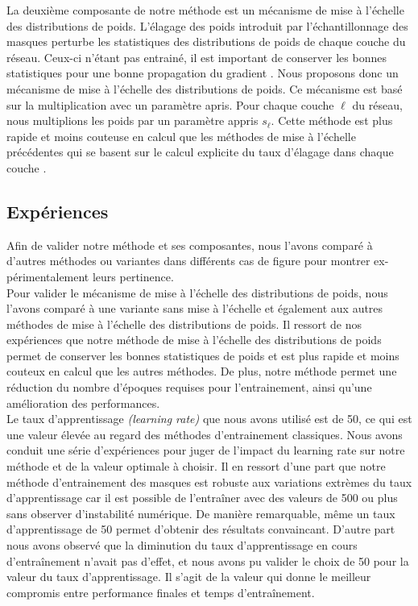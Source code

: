 La deuxième composante de notre méthode est un mécanisme de mise à l'échelle des
distributions de poids. L'élagage des poids introduit par l'échantillonnage des
masques perturbe les statistiques des distributions de poids de chaque couche du
réseau. Ceux-ci n'étant pas entrainé, il est important de conserver les bonnes
statistiques pour une bonne propagation du gradient
\cite{DBLP:conf/iccv/HeZRS15}. Nous proposons donc un mécanisme de mise à
l'échelle des distributions de poids. Ce mécanisme est basé sur la
multiplication avec un paramètre apris. Pour chaque couche $\ell$ du réseau,
nous multiplions les poids par un paramètre appris $s_\ell$. Cette méthode est
plus rapide et moins couteuse en calcul que les méthodes de mise à l'échelle
précédentes qui se basent sur le calcul explicite du taux d'élagage dans chaque
couche \cite{DBLP:conf/cvpr/RamanujanWKFR20,DBLP:conf/nips/ZhouLLY19}.

\subsection*{Expériences}
Afin de valider notre méthode et ses composantes, nous l’avons comparé à
d’autres méthodes ou variantes dans différents cas de figure pour montrer ex-
périmentalement leurs pertinence.\\

Pour valider le mécanisme de mise à l’échelle des distributions de poids, nous
l'avons comparé à une variante sans mise à l'échelle et également aux autres
méthodes de mise à l'échelle des distributions de poids. Il ressort de nos
expériences que notre méthode de mise à l'échelle des distributions de poids
permet de conserver les bonnes statistiques de poids et est plus rapide et moins
couteux en calcul que les autres méthodes. De plus, notre méthode permet une
réduction du nombre d'époques requises pour l'entrainement, ainsi qu'une
amélioration des performances.\\

Le taux d'apprentissage \emph{(learning rate)} que nous avons utilisé est de 50,
ce qui est une valeur élevée au regard des méthodes d'entrainement classiques.
Nous avons conduit une série d'expériences pour juger de l'impact du learning
rate sur notre méthode et de la valeur optimale à choisir. Il en ressort d'une
part que notre méthode d'entrainement des masques est robuste aux variations
extrèmes du taux d'apprentissage car il est possible de l'entraîner avec des
valeurs de 500 ou plus sans observer d'instabilité numérique. De manière
remarquable, même un taux d'apprentissage de 50 permet d'obtenir des résultats
convaincant. D'autre part nous avons observé que la diminution du taux
d'apprentissage en cours d'entraînement n'avait pas d'effet, et nous avons pu
valider le choix de 50 pour la valeur du taux d'apprentissage. Il s'agit de la
valeur qui donne le meilleur compromis entre performance finales et temps
d'entraînement.\\

